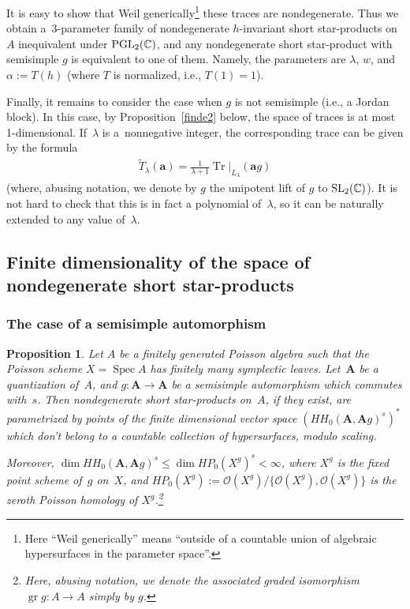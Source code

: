 \documentclass[pdftex]{sigma}
\numberwithin{equation}{section}
\newtheorem{Proposition}[Theorem]{Proposition}
\begin{document}
\begin{Example}
It is easy to show that Weil generically\footnote{Here ``Weil generically'' means ``outside of a countable union of algebraic hypersurfaces in the parameter space''.} these traces are nondegenerate. Thus we obtain a~3-parameter family of nondegenerate $h$-invariant short star-products on $A$ inequivalent under ${\rm PGL}_2({\mathbb C})$, and any nondegenerate short star-product with semisimple $g$ is equivalent to one of them. Namely, the parameters are $\lambda$, $w$, and $\alpha:=T(h)$ (where $T$ is normalized, i.e., $T(1)=1$).

Finally, it remains to consider the case when $g$ is not semisimple (i.e., a Jordan block). In this case, by Proposition~\ref{finde2} below, the space of traces is at most 1-dimensional. If~$\lambda$ is a~nonnegative integer, the corresponding trace can be given by the formula
\begin{gather*}
\widetilde{T}_\lambda({\mathbf a})=\frac{1}{\lambda+1}\operatorname{Tr}|_{L_\lambda}({\mathbf a} g)
\end{gather*}
(where, abusing notation, we denote by $g$ the unipotent lift of $g$ to ${\rm SL}_2({\mathbb C})$). It is not hard to check that this is in fact a polynomial of~$\lambda$, so it can be naturally extended to any value of~$\lambda$.
\end{Example}

\subsection{Finite dimensionality of the space of nondegenerate short star-products}

\subsubsection{The case of a semisimple automorphism}

\begin{Proposition}\label{finde1} Let $A$ be a finitely generated Poisson algebra such that the Poisson scheme $X=\operatorname{Spec}A$ has finitely many symplectic leaves. Let~${\mathbf A}$ be a quantization of~$A$, and \mbox{$g\colon {{\mathbf A}}\to {{\mathbf A}}$} be a semisimple automorphism which commutes with~$s$. Then nondegenerate short star-products on~$A$, if they exist, are parametrized by points of the finite dimensional vector space \linebreak $(HH_0({{\mathbf A}},{{\mathbf A}}g)^s)^*$ which don't belong to a countable collection of hypersurfaces, modulo scaling.

Moreover, $\dim HH_0({{\mathbf A}},{{\mathbf A}}g)^s\le \dim HP_0(X^g)^s<\infty$, where $X^g$ is the fixed point scheme of~$g$ on~$X$, and $HP_0(X^g):= \mathcal{O}(X^g)/\lbrace{\mathcal{O}(X^g), \mathcal{O}(X^g)\rbrace}$ is the zeroth Poisson homology of $X^g$.\footnote{Here, abusing notation, we denote the associated graded isomorphism $\operatorname{gr}g\colon A\to A$ simply by $g$.}
\end{Proposition}
\end{document}
